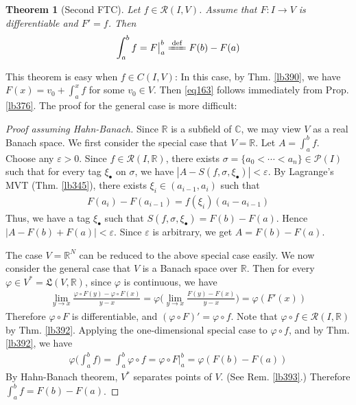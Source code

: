 \documentclass[12pt,b5paper,notitlepage]{article}
\theoremstyle{definition}
\theoremstyle{plain}
\newtheorem{thm}[df]{Theorem}
\newcommand{\fk}{\mathfrak}
\newcommand{\mc}{\mathcal}
\newcommand{\scr}{\mathscr}
\newcommand{\blt}{\bullet}
\newcommand{\Cbb}{\mathbb C}
\newcommand{\Rbb}{\mathbb R}
\newcommand{\eps}{\varepsilon}
\numberwithin{equation}{section}
\begin{document}
\begin{thm}[Second FTC]\label{lb391}
Let $f\in\scr R(I,V)$. Assume that $F:I\rightarrow V$ is differentiable and $F'=f$. Then
\begin{align}
\int_a^bf=F\big|^b_a\xlongequal{\mathrm{def}} F(b)-F(a)  \label{eq163}
\end{align}
\end{thm}

This theorem is easy when $f\in C(I,V)$: In this case,   by Thm. \ref{lb390}, we have $F(x)=v_0+\int_a^x f$ for some $v_0\in V$. Then \eqref{eq163} follows immediately from Prop. \ref{lb376}. The proof for the general case is more difficult:

\begin{proof}[Proof assuming Hahn-Banach]
Since $\Rbb$ is a subfield of $\Cbb$, we may view $V$ as a real Banach space. We first consider the special case that $V=\Rbb$. Let $A=\int_a^bf$. Choose any $\eps>0$. Since $f\in\scr R(I,\Rbb)$, there exists $\sigma=\{a_0<\cdots<a_n\}\in\mc P(I)$ such that for every tag $\xi_\blt$ on $\sigma$, we have $|A-S(f,\sigma,\xi_\blt)|<\eps$. By Lagrange's MVT (Thm. \ref{lb345}), there exists $\xi_i\in (a_{i-1},a_i)$ such that
\begin{align*}
F(a_i)-F(a_{i-1})=f(\xi_i)(a_i-a_{i-1})
\end{align*}
Thus, we have a tag $\xi_\blt$ such that $S(f,\sigma,\xi_\blt)=F(b)-F(a)$. Hence $|A-F(b)+F(a)|<\eps$. Since $\eps$ is arbitrary, we get $A=F(b)-F(a)$.

The case $V=\Rbb^N$ can be reduced to the above special case easily. We now consider the general case that $V$ is a Banach space over $\Rbb$. Then for every $\varphi\in V^*=\fk L(V,\Rbb)$, since $\varphi$ is continuous, we have
\begin{align*}
\lim_{y\rightarrow x}\frac{\varphi\circ F(y)-\varphi\circ F(x)}{y-x}=\varphi\Big(\lim_{y\rightarrow x}\frac{F(y)-F(x)}{y-x}\Big)=\varphi(F'(x))
\end{align*}
Therefore $\varphi\circ F$ is differentiable, and $(\varphi\circ F)'=\varphi\circ f$. Note that $\varphi\circ f\in\scr R(I,\Rbb)$ by Thm. \ref{lb392}. Applying the one-dimensional special case to $\varphi\circ f$, and by Thm. \ref{lb392}, we have
\begin{align*}
\varphi\Big(\int_a^b f\Big)=\int_a^b \varphi\circ f=\varphi\circ F\big|_a^b=\varphi(F(b)-F(a))
\end{align*}
By Hahn-Banach theorem, $V^*$ separates points of $V$. (See Rem. \ref{lb393}.) Therefore $\int_a^b f=F(b)-F(a)$.
\end{proof}
\end{document}

